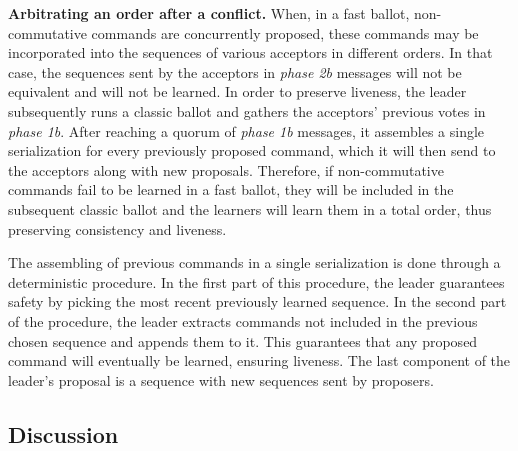 \noindent\textbf{Arbitrating an order after a conflict.} When, in a fast ballot, non-commutative commands are  concurrently proposed, these commands may be incorporated into the sequences of various acceptors in different orders. In that case, the sequences sent by the acceptors in \textit{phase 2b} messages will not be equivalent and will not be learned. In order to preserve liveness, the leader subsequently runs a classic ballot and gathers the acceptors' previous votes in \textit{phase 1b}. After reaching a quorum of \textit{phase 1b} messages, it assembles a single serialization for every previously proposed command, which it will then send to the acceptors along with new proposals. Therefore, if non-commutative commands fail to be learned in a fast ballot, they will be included in the subsequent classic ballot and the learners will learn them in a total order, thus preserving consistency and liveness. \par 
The assembling of previous commands in a single serialization is done through a deterministic procedure. In the first part of this procedure, the leader guarantees safety by picking the most recent previously learned sequence. In the second part of the procedure, the leader extracts commands not included in the previous chosen sequence and appends them to it. This guarantees that any proposed command will eventually be learned, ensuring liveness. The last component of the leader's proposal is a sequence with new sequences sent by proposers. 

\subsection{Discussion}

